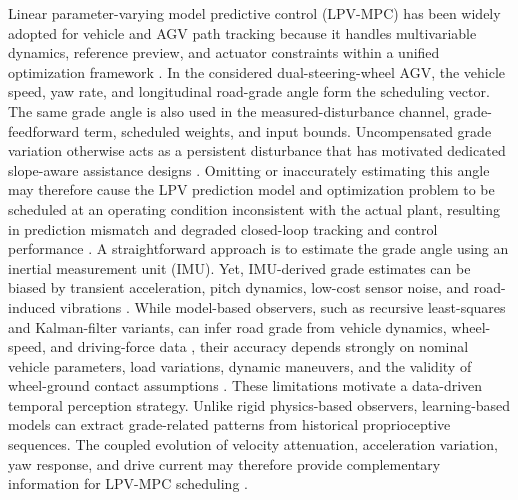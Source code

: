 \documentclass{ieeeaccess}
\newcommand{\citep}[1]{\cite{#1}}
\begin{document}
Linear parameter-varying model predictive control (LPV-MPC) has been widely adopted for vehicle and AGV path tracking because it handles multivariable dynamics, reference preview, and actuator constraints within a unified optimization framework \citep{Manikandan2022CurveAwareMPCAGV,Alcala2020AutonomousRacingLPVMPC,Kedir2024PSOLPVMPC,Domina2022LTVMPC}. In the considered dual-steering-wheel AGV, the vehicle speed, yaw rate, and longitudinal road-grade angle form the scheduling vector. The same grade angle is also used in the measured-disturbance channel, grade-feedforward term, scheduled weights, and input bounds. Uncompensated grade variation otherwise acts as a persistent disturbance that has motivated dedicated slope-aware assistance designs \citep{Luo2015DownhillAssist}. Omitting or inaccurately estimating this angle may therefore cause the LPV prediction model and optimization problem to be scheduled at an operating condition inconsistent with the actual plant, resulting in prediction mismatch and degraded closed-loop tracking and control performance \citep{Sato2013InexactScheduling,Pan2022InexactSchedulingLPV,Metzler2021PredictionFidelity}. A straightforward approach is to estimate the grade angle using an inertial measurement unit (IMU). Yet, IMU-derived grade estimates can be biased by transient acceleration, pitch dynamics, low-cost sensor noise, and road-induced vibrations \citep{Jauch2018IMUGradeOrientation,Liu2023RoadSlopeAAIMM,Gao2024RoadSlopeHDV}. While model-based observers, such as recursive least-squares and Kalman-filter variants, can infer road grade from vehicle dynamics, wheel-speed, and driving-force data \citep{Jiang2019AdaptiveSlopeMass,Guo2022SageHusaAKF}, their accuracy depends strongly on nominal vehicle parameters, load variations, dynamic maneuvers, and the validity of wheel-ground contact assumptions \citep{Gao2024RoadSlopeHDV}. These limitations motivate a data-driven temporal perception strategy. Unlike rigid physics-based observers, learning-based models can extract grade-related patterns from historical proprioceptive sequences. The coupled evolution of velocity attenuation, acceleration variation, yaw response, and drive current may therefore provide complementary information for LPV-MPC scheduling \citep{Liang2022LSTMRoadID}.
\end{document}
